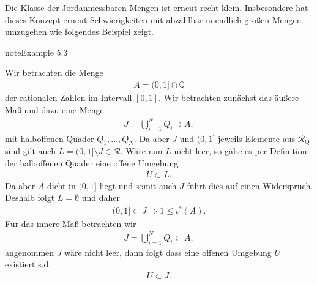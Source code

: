 \documentclass[letterpaper,10pt,german]{jupyterBook}
\begin{document}
\sphinxAtStartPar
Die Klasse der Jordan\sphinxhyphen{}messbaren Mengen ist erneut recht klein. Insbesondere hat dieses Konzept erneut Schwierigkeiten mit abzählbar unendlich großen Mengen umzugehen wie folgendes Beispiel zeigt.
\label{masstheorie/masstheorie:ex:jordan}
\begin{sphinxadmonition}{note}{Example 5.3}



\sphinxAtStartPar
Wir betrachten die Menge
\begin{equation*}
\begin{split}A = (0,1]\cap \mathbb{Q}\end{split}
\end{equation*}
\sphinxAtStartPar
der rationalen Zahlen im Intervall \([0,1]\). Wir betrachten zunächst das äußere Maß und dazu eine Menge
\begin{equation*}
\begin{split}J = \bigcup_{i=1}^N Q_i \supset A,\end{split}
\end{equation*}
\sphinxAtStartPar
mit halboffenen Quader \(Q_1,\ldots,Q_N\). Da aber \(J\) und \((0,1]\) jeweils Elemente aus \(\mathcal{R}_{\text{Q}}\) sind gilt auch
\(L = (0,1]\setminus J \in\mathcal{R}\). Wäre nun \(L\) nicht leer, so gäbe es per Definition der halboffenen Quader eine offene Umgebung
\begin{equation*}
\begin{split}U\subset L.\end{split}
\end{equation*}
\sphinxAtStartPar
Da aber \(A\) dicht in \((0,1]\) liegt und somit auch \(J\) führt dies auf einen Widerspruch. Deshalb folgt \(L=\emptyset\) und daher
\begin{equation*}
\begin{split}(0,1]\subset J \Rightarrow 1\leq \iota^\ast(A).\end{split}
\end{equation*}
\sphinxAtStartPar
Für das innere Maß betrachten wir
\begin{equation*}
\begin{split}J = \bigcup_{i=1}^N Q_i \subset A,\end{split}
\end{equation*}
\sphinxAtStartPar
angenommen \(J\) wäre nicht leer, dann folgt dass eine offenen Umgebung \(U\) existiert s.d.
\begin{equation*}
\begin{split}U\subset J.\end{split}

\end{equation*}
\end{sphinxadmonition}
\end{document}
